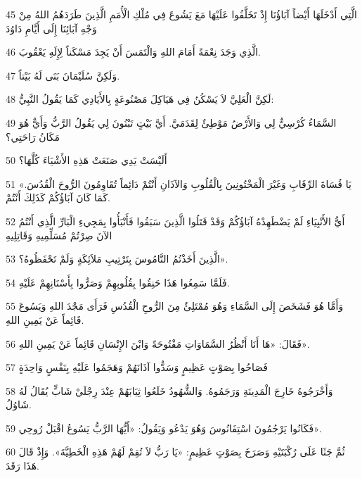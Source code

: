 \par 45 الَّتِي أَدْخَلَهَا أَيْضاً آبَاؤُنَا إِذْ تَخَلَّفُوا عَلَيْهَا مَعَ يَشُوعَ فِي مُلْكِ الْأُمَمِ الَّذِينَ طَرَدَهُمُ اللهُ مِنْ وَجْهِ آبَائِنَا إِلَى أَيَّامِ دَاوُدَ
\par 46 الَّذِي وَجَدَ نِعْمَةً أَمَامَ اللهِ وَالْتَمَسَ أَنْ يَجِدَ مَسْكَناً لِإِلَهِ يَعْقُوبَ.
\par 47 وَلَكِنَّ سُلَيْمَانَ بَنَى لَهُ بَيْتاً.
\par 48 لَكِنَّ الْعَلِيَّ لاَ يَسْكُنُ فِي هَيَاكِلَ مَصْنُوعَةٍ بِالأَيَادِي كَمَا يَقُولُ النَّبِيُّ:
\par 49 السَّمَاءُ كُرْسِيٌّ لِي وَالأَرْضُ مَوْطِئٌ لِقَدَمَيَّ. أَيَّ بَيْتٍ تَبْنُونَ لِي يَقُولُ الرَّبُّ وَأَيٌّ هُوَ مَكَانُ رَاحَتِي؟
\par 50 أَلَيْسَتْ يَدِي صَنَعَتْ هَذِهِ الأَشْيَاءَ كُلَّهَا؟
\par 51 «يَا قُسَاةَ الرِّقَابِ وَغَيْرَ الْمَخْتُونِينَ بِالْقُلُوبِ وَالآذَانِ أَنْتُمْ دَائِماً تُقَاوِمُونَ الرُّوحَ الْقُدُسَ. كَمَا كَانَ آبَاؤُكُمْ كَذَلِكَ أَنْتُمْ.
\par 52 أَيُّ الأَنْبِيَاءِ لَمْ يَضْطَهِدْهُ آبَاؤُكُمْ وَقَدْ قَتَلُوا الَّذِينَ سَبَقُوا فَأَنْبَأُوا بِمَجِيءِ الْبَارِّ الَّذِي أَنْتُمُ الآنَ صِرْتُمْ مُسَلِّمِيهِ وَقَاتِلِيهِ
\par 53 الَّذِينَ أَخَذْتُمُ النَّامُوسَ بِتَرْتِيبِ مَلاَئِكَةٍ وَلَمْ تَحْفَظُوهُ؟».
\par 54 فَلَمَّا سَمِعُوا هَذَا حَنِقُوا بِقُلُوبِهِمْ وَصَرُّوا بِأَسْنَانِهِمْ عَلَيْهِ.
\par 55 وَأَمَّا هُوَ فَشَخَصَ إِلَى السَّمَاءِ وَهُوَ مُمْتَلِئٌ مِنَ الرُّوحِ الْقُدُسِ فَرَأَى مَجْدَ اللهِ وَيَسُوعَ قَائِماً عَنْ يَمِينِ اللهِ.
\par 56 فَقَالَ: «هَا أَنَا أَنْظُرُ السَّمَاوَاتِ مَفْتُوحَةً وَابْنَ الإِنْسَانِ قَائِماً عَنْ يَمِينِ اللهِ».
\par 57 فَصَاحُوا بِصَوْتٍ عَظِيمٍ وَسَدُّوا آذَانَهُمْ وَهَجَمُوا عَلَيْهِ بِنَفْسٍ وَاحِدَةٍ
\par 58 وَأَخْرَجُوهُ خَارِجَ الْمَدِينَةِ وَرَجَمُوهُ. وَالشُّهُودُ خَلَعُوا ثِيَابَهُمْ عِنْدَ رِجْلَيْ شَابٍّ يُقَالُ لَهُ شَاوُلُ.
\par 59 فَكَانُوا يَرْجُمُونَ اسْتِفَانُوسَ وَهُوَ يَدْعُو وَيَقُولُ: «أَيُّهَا الرَّبُّ يَسُوعُ اقْبَلْ رُوحِي».
\par 60 ثُمَّ جَثَا عَلَى رُكْبَتَيْهِ وَصَرَخَ بِصَوْتٍ عَظِيمٍ: «يَا رَبُّ لاَ تُقِمْ لَهُمْ هَذِهِ الْخَطِيَّةَ». وَإِذْ قَالَ هَذَا رَقَدَ.

